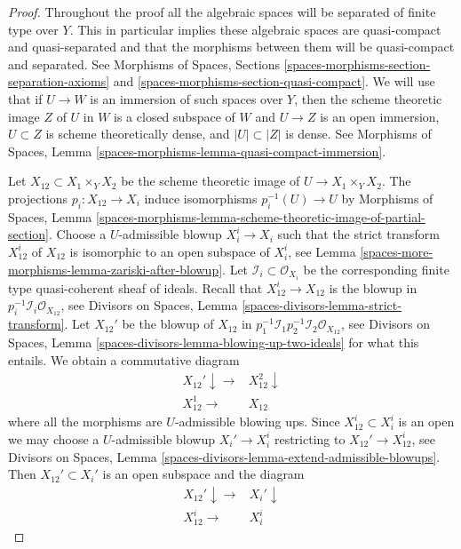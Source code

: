 \begin{proof}
Throughout the proof all the algebraic spaces will be separated of finite
type over $Y$. This in particular implies these algebraic spaces are
quasi-compact and quasi-separated and that the morphisms between them
will be quasi-compact and separated. See
Morphisms of Spaces, Sections
\ref{spaces-morphisms-section-separation-axioms} and
\ref{spaces-morphisms-section-quasi-compact}.
We will use that if $U \to W$ is an immersion of such spaces over $Y$,
then the scheme theoretic image $Z$ of $U$ in $W$ is a closed subspace
of $W$ and $U \to Z$ is an open immersion, $U \subset Z$ is scheme
theoretically dense, and $|U| \subset |Z|$ is dense. See
Morphisms of Spaces, Lemma
\ref{spaces-morphisms-lemma-quasi-compact-immersion}.

\medskip\noindent
Let $X_{12} \subset X_1 \times_Y X_2$ be the scheme theoretic image
of $U \to X_1 \times_Y X_2$. The projections $p_i : X_{12} \to X_i$
induce isomorphisms $p_i^{-1}(U) \to U$ by
Morphisms of Spaces, Lemma
\ref{spaces-morphisms-lemma-scheme-theoretic-image-of-partial-section}.
Choose a $U$-admissible blowup $X_i^i \to X_i$ such that
the strict transform $X_{12}^i$ of $X_{12}$ is isomorphic to an
open subspace of $X_i^i$, see
Lemma \ref{spaces-more-morphisms-lemma-zariski-after-blowup}.
Let $\mathcal{I}_i \subset \mathcal{O}_{X_i}$ be the corresponding
finite type quasi-coherent sheaf of ideals.
Recall that $X_{12}^i \to X_{12}$ is the blowup in
$p_i^{-1}\mathcal{I}_i \mathcal{O}_{X_{12}}$, see
Divisors on Spaces, Lemma \ref{spaces-divisors-lemma-strict-transform}.
Let $X_{12}'$ be the blowup of $X_{12}$ in
$p_1^{-1}\mathcal{I}_1 p_2^{-1}\mathcal{I}_2 \mathcal{O}_{X_{12}}$, see
Divisors on Spaces, Lemma \ref{spaces-divisors-lemma-blowing-up-two-ideals}
for what this entails. We obtain a commutative diagram
$$
\begin{array}{cc}X_{12}' \downarrow\longrightarrow & X_{12}^2 \downarrow \\ X_{12}^1 \longrightarrow & X_{12}\end{array}
$$
where all the morphisms are $U$-admissible blowing ups. Since
$X_{12}^i \subset X_i^i$ is an open we may choose a $U$-admissible blowup
$X_i' \to X_i^i$ restricting to $X_{12}' \to X_{12}^i$, see
Divisors on Spaces, Lemma
\ref{spaces-divisors-lemma-extend-admissible-blowups}.
Then $X_{12}' \subset X_i'$ is an open subspace and the diagram
$$
\begin{array}{cc}X_{12}' \downarrow\longrightarrow & X_i' \downarrow \\ X_{12}^i \longrightarrow & X_i^i\end{array}
$$
\end{proof}

